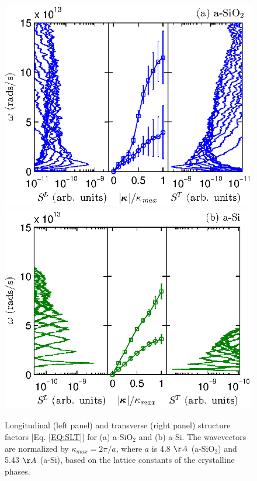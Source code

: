 \documentclass[aps,prb,onecolumn,preprint,superscriptaddress,footinbib,amsmath,amssymb,floatfix]{revtex4}
\begin{document}
\begin{figure}
\begin{center}
\includegraphics[scale=1.0]
{fig3b.eps}
\includegraphics[scale=1.0]
{fig3a.eps}
\end{center}
\caption{\label{FIG:disp} Longitudinal (left panel) and transverse 
(right panel) structure factors [Eq. \eqref{EQ:SLT}] for (a) a-SiO$_2$ 
and (b) a-Si. 
The wavevectors are normalized by $\kappa_{max} = 2\pi/a$, where $a$ 
is 4.8 $\AA$ (a-SiO$_2$) and 5.43 $\AA$ (a-Si), based 
on the lattice constants of the crystalline phases.
\cite{stillinger_computer_1985,van_Beest_force_1990} }
\end{figure}
\end{document}
